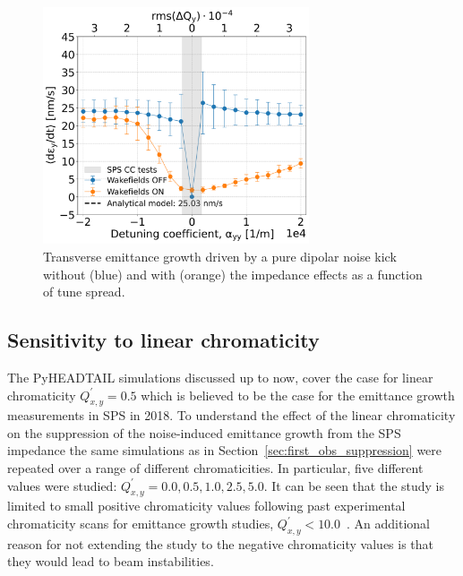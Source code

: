 \begin{figure}[!h] %
    \centering         
    \includegraphics[width=0.7\textwidth]{images/Ch7/deyRates_final_2018_PN_sps_270GeV_DipoleNoiseSQRT1e-8_y-plane_QpxQpy5e-1_6D_Nb5e5_intensity3e10_ayyScan_wakesON_vs_OFF_vs_TuneSpreadvsExpectedSPS.png}
        \caption{Transverse emittance growth driven by a pure dipolar noise kick without (blue) and with (orange) the impedance effects as a function of tune spread.}
        \label{fig:study_5_dipole_noise}
 \end{figure}

\subsection{Sensitivity to linear chromaticity}\label{subsec:chroma_scan}
The PyHEADTAIL simulations discussed up to now, cover the case for linear chromaticity $Q^\prime_{x,y}=0.5$ which is believed to be the case for the emittance growth measurements in SPS in 2018. To understand the effect of the linear chromaticity on the suppression of the noise-induced emittance growth from the SPS impedance the same simulations as in Section~\ref{sec:first_obs_suppression} were repeated over a range of different chromaticities. In particular, five different values were studied: $Q^\prime_{x,y}=0.0, 0.5, 1.0, 2.5, 5.0$. It can be seen that the study is limited to small positive chromaticity values following past experimental chromaticity scans for emittance growth studies,  $Q^\prime_{x,y}< 10.0$~\cite{Antoniou:2649815, Calaga:1451286}. An additional reason for not extending the study to the negative chromaticity values is that they would lead to beam instabilities.

